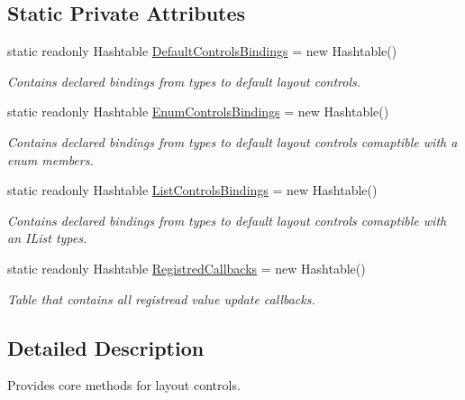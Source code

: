 \subsection*{Static Private Attributes}
\begin{DoxyCompactItemize}
\item 
static readonly Hashtable \mbox{\hyperlink{class_wpf_handler_1_1_u_i_1_1_auto_layout_1_1_layout_handler_a15ec26f7b47df47d599c8e649b766463}{Default\+Controls\+Bindings}} = new Hashtable()
\begin{DoxyCompactList}\small\item\em Contains declared bindings from types to default layout controls. \end{DoxyCompactList}\item 
static readonly Hashtable \mbox{\hyperlink{class_wpf_handler_1_1_u_i_1_1_auto_layout_1_1_layout_handler_ae61aae6b0256f71e33dc8c8ed1403ff0}{Enum\+Controls\+Bindings}} = new Hashtable()
\begin{DoxyCompactList}\small\item\em Contains declared bindings from types to default layout controls comaptible with a enum members. \end{DoxyCompactList}\item 
static readonly Hashtable \mbox{\hyperlink{class_wpf_handler_1_1_u_i_1_1_auto_layout_1_1_layout_handler_aec598e1921c5fe2ba40f57772be8ac5d}{List\+Controls\+Bindings}} = new Hashtable()
\begin{DoxyCompactList}\small\item\em Contains declared bindings from types to default layout controls comaptible with an I\+List types. \end{DoxyCompactList}\item 
static readonly Hashtable \mbox{\hyperlink{class_wpf_handler_1_1_u_i_1_1_auto_layout_1_1_layout_handler_afda300c91d5d5e45c7fb51d1154fcf4b}{Registred\+Callbacks}} = new Hashtable()
\begin{DoxyCompactList}\small\item\em Table that contains all registread value update callbacks. \end{DoxyCompactList}\end{DoxyCompactItemize}


\subsection{Detailed Description}
Provides core methods for layout controls. 




